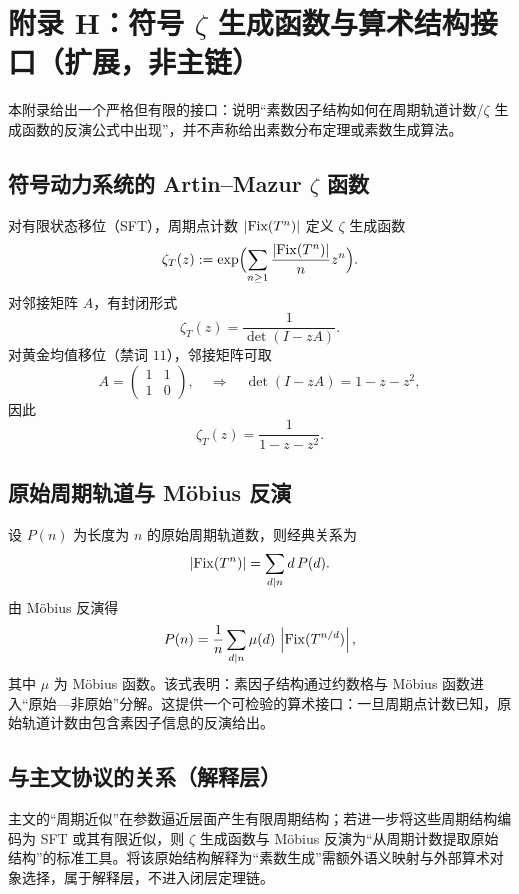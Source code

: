 \section{附录 H：符号 \texorpdfstring{$\zeta$}{zeta} 生成函数与算术结构接口（扩展，非主链）}
\label{app:zeta-interface}

本附录给出一个严格但有限的接口：说明“素数因子结构如何在周期轨道计数/$\zeta$ 生成函数的反演公式中出现”，并不声称给出素数分布定理或素数生成算法。

\subsection{符号动力系统的 Artin--Mazur \texorpdfstring{$\zeta$}{zeta} 函数}

对有限状态移位（SFT），周期点计数 $\left\lvert \mathrm{Fix}(T^n)\right\rvert$ 定义 $\zeta$ 生成函数
\[
\zeta_T(z):=\exp\Bigl(\sum_{n\ge 1}\frac{\left\lvert \mathrm{Fix}(T^n)\right\rvert}{n}z^n\Bigr).
\]
对邻接矩阵 $A$，有封闭形式
\[
\zeta_T(z)=\frac{1}{\det(I-zA)}.
\]
对黄金均值移位（禁词 $11$），邻接矩阵可取
\[
A=\begin{pmatrix}1&1\\1&0\end{pmatrix},
\quad\Rightarrow\quad
\det(I-zA)=1-z-z^2,
\]
因此
\[
\zeta_T(z)=\frac{1}{1-z-z^2}.
\]

\subsection{原始周期轨道与 Möbius 反演}

设 $P(n)$ 为长度为 $n$ 的原始周期轨道数，则经典关系为
\[
\left\lvert \mathrm{Fix}(T^n)\right\rvert=\sum_{d\mid n} d\,P(d).
\]
由 Möbius 反演得
\[
P(n)=\frac{1}{n}\sum_{d\mid n}\mu(d)\,\left\lvert \mathrm{Fix}(T^{n/d})\right\rvert,
\]
其中 $\mu$ 为 Möbius 函数。该式表明：素因子结构通过约数格与 Möbius 函数进入“原始—非原始”分解。这提供一个可检验的算术接口：一旦周期点计数已知，原始轨道计数由包含素因子信息的反演给出。

\subsection{与主文协议的关系（解释层）}

主文的“周期近似”在参数逼近层面产生有限周期结构；若进一步将这些周期结构编码为 SFT 或其有限近似，则 $\zeta$ 生成函数与 Möbius 反演为“从周期计数提取原始结构”的标准工具。将该原始结构解释为“素数生成”需额外语义映射与外部算术对象选择，属于解释层，不进入闭层定理链。

